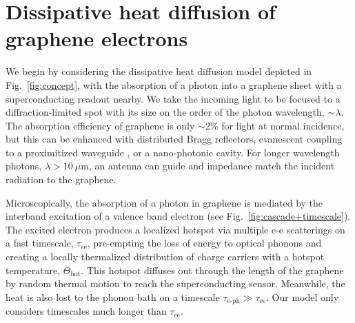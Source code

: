 \documentclass[aip, amsmath,amssymb, reprint]{revtex4-1}
\begin{document}
\section{Dissipative heat diffusion of graphene electrons}\label{sec:1st}

We begin by considering the dissipative heat diffusion model depicted in Fig.\ \ref{fig:concept}, with the absorption of a photon into a graphene sheet with a superconducting readout nearby. We take the incoming light to be focused to a diffraction-limited spot with its size on the order of the photon wavelength, $\sim\lambda$. The absorption efficiency of graphene is only $\sim$2\% for light at normal incidence\cite{Sarma.2011}, but this can be enhanced with distributed Bragg reflectors\cite{Vasić.2014}, evanescent coupling to a proximitized waveguide \cite{Wang.2020waveguide}, or a nano-photonic cavity\cite{Efetov.2018}. For longer wavelength photons, $\lambda > 10~\mu$m, an antenna can guide and impedance match the incident radiation to the graphene\cite{Castilla.2019,Lee.2020}. 

Microscopically, the absorption of a photon in graphene is mediated by the interband excitation of a valence band electron\cite{Massicotte.2021} (see Fig.\ \ref{fig:cascade+timescale}). The excited electron produces a localized hotspot via multiple e-e scatterings on a fast timescale\cite{Brida.2013,Johannsen.2013,Somphonsane.2013,Gallagher.2019,Block.2021}, $\tau_{\text{ee}}$, pre-empting the loss of energy to optical phonons and creating a locally thermalized distribution of charge carriers with a hotspot temperature, $\Theta_{\text{hot}}$. This hotspot diffuses out through the length of the graphene by random thermal motion to reach the superconducting sensor. Meanwhile, the heat is also lost to the phonon bath on a timescale $\tau_{\text{e-ph}}\gg\tau_{\text{ee}}$. Our model only considers timescales much longer than $\tau_{\text{ee}}$.
\end{document}
